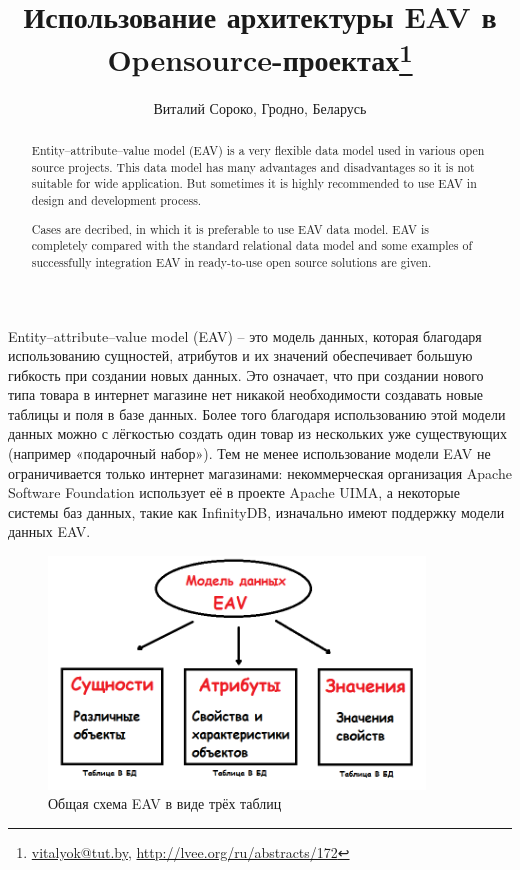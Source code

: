 \documentclass[10pt, a5paper]{article}
\begin{document}
\title{Использование архитектуры  EAV в Opensource-проектах\footnote{\url{vitalyok@tut.by}, \url{http://lvee.org/ru/abstracts/172}}}
\author{Виталий Сороко, Гродно, Беларусь}
\maketitle
\begin{abstract}
Entity–attribute–value model (EAV) is a very flexible data model used in various open source projects. This data model has many advantages and disadvantages so it is not suitable for wide application. But sometimes it is highly recommended to use EAV in design and development process.

Cases are decribed, in which it is preferable to use EAV data model. EAV is completely compared with the standard relational data model and  some examples of  successfully integration EAV in ready-to-use open source solutions are given.
\end{abstract}

Entity–attribute–value model (EAV) – это модель данных, которая благодаря использованию сущностей, атрибутов и их значений обеспечивает большую гибкость при создании новых данных. Это означает, что при создании нового типа товара в интернет магазине нет никакой необходимости создавать новые таблицы и поля в базе данных. Более того благодаря использованию этой модели данных можно с лёгкостью создать один товар из нескольких уже существующих (например «подарочный набор»). Тем не менее использование модели  EAV не ограничивается только интернет магазинами: некоммерческая организация Apache Software Foundation использует её в проекте Apache UIMA, а некоторые системы баз данных, такие как InfinityDB, изначально имеют поддержку модели данных EAV.

\begin{figure}[h!]
  \centering
  \includegraphics[width=10cm]{w_10_2016_Soroko1.png}
  \caption {Общая схема EAV в виде трёх таблиц}\label{Soroko1}
\end{figure} 
\end{document}
